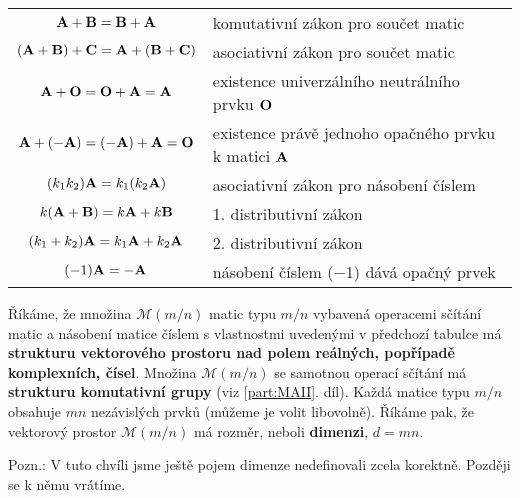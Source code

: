       \begin{table}[ht!]
        \centering
        \begin{tabular}{c | L{8cm}}
        \toprule
          \(\mathbf{A} + \mathbf{B} = \mathbf{B} + \mathbf{A}\)
                                       & komutativní zákon pro součet matic  \\ %
          \((\mathbf{A} + \mathbf{B}) + \mathbf{C} =\mathbf{A} + (\mathbf{B} + \mathbf{C})\)
                                       & asociativní zákon pro součet matic  \\
          \(\mathbf{A} + \mathbf{O} = \mathbf{O} + \mathbf{A} = \mathbf{A}\)
                                       & existence univerzálního neutrálního prvku \(\mathbf{O}\)  \\
          \(\mathbf{A} + (-\mathbf{A}) = (-\mathbf{A}) + \mathbf{A} = \mathbf{O}\)
                                       & existence právě jednoho opačného prvku k matici 
                                       \(\mathbf{A}\)\\ 
          \((k_1k_2)\mathbf{A} = k_1(k_2\mathbf{A})\) 
                                       & asociativní zákon pro násobení číslem \\
          \(k(\mathbf{A} + \mathbf{B}) = k\mathbf{A} + k\mathbf{B}\)
                                       & 1. distributivní zákon  \\
          \((k_1 + k_2)\mathbf{A} = k_1\mathbf{A} + k_2\mathbf{A}\)
                                       & 2. distributivní zákon \\
          \((-1)\mathbf{A}= -\mathbf{A}\)
                                       & násobení číslem (\num{-1}) dává opačný prvek  \\
         \bottomrule
        \end{tabular}
      \end{table}
      Říkáme, že množina \(\mathcal{M}(m/n)\) matic typu \(m/n\) vybavená operacemi sčítání matic a 
      násobení matice číslem s vlastnostmi uvedenými v předchozí tabulce má \textbf{strukturu 
      vektorového prostoru nad polem reálných, popřípadě komplexních, čísel}. Množina 
      \(\mathcal{M}(m/n)\) se samotnou operací sčítání má \textbf{strukturu komutativní grupy} (viz 
      \ref{part:MAII}. díl). Každá matice typu \(m/n\) obsahuje \(mn\) nezávislých prvků (můžeme je 
      volit libovolně). Říkáme pak, že vektorový prostor \(\mathcal{M}(m/n)\) má rozměr, neboli 
      \textbf{dimenzi}, \(d = mn\).
      
      Pozn.: V tuto chvíli jsme ještě pojem dimenze nedefinovali zcela korektně. Později se k němu 
      vrátíme.
      
